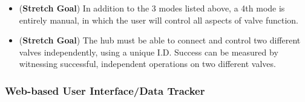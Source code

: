 \documentclass[onecolumn, draftclsnofoot,10pt, compsoc]{IEEEtran}
\newcounter{subsubsubsection}[subsubsection]
\newcounter{subsubsubsubsection}[subsubsubsection]
\begin{document}
\begin{itemize}
		\item[]{(\textbf{Stretch Goal}) In addition to the 3 modes listed above, a 4th mode is entirely manual, in which the user will control all aspects of valve function.}
		\item[]{(\textbf{Stretch Goal}) The hub must be able to connect and control two different valves independently, using a unique I.D. Success can be measured by witnessing successful, independent operations on two different valves.}
	\end{itemize}
	
	\subsubsection{Web-based User Interface/Data Tracker}
	
\end{document}
